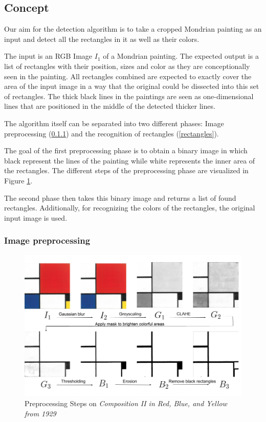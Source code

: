 \documentclass[serif,article,noparskip]{agse-thesis}
\begin{document}

\subsection{Concept} \label{concept}


Our aim for the detection algorithm is to take a cropped Mondrian painting as
an input and detect all the rectangles in it as well as their colors.

The input is an RGB Image $I_1$ of a Mondrian painting. The expected output is a
list of rectangles with their position, sizes and color as they are
conceptionally seen in the painting. All rectangles combined are expected to
exactly cover the area of the input image in a way that the original could be
dissected into this set of rectangles. The thick black lines in the paintings
are seen as one-dimensional lines that are positioned in the middle of the
detected thicker lines.

The algorithm itself can be separated into two different phases: Image
preprocessing (\ref{preprocessing}) and the recognition of rectangles (\ref{rectangles}).

The goal of the first preprocessing phase is to obtain a binary image in which
black represent the lines of the painting while white represents the inner area
of the rectangles. The different steps of the preprocessing phase are visualized
in Figure \ref{fig:preprocessing}.

The second phase then takes this binary image and returns a list of found
rectangles. Additionally, for recognizing the colors of the rectangles, the
original input image is used.

\subsubsection{Image preprocessing} \label{preprocessing}

\begin{figure}
  \includegraphics[width=\linewidth]{images/preprocessing_steps.png}
  \caption{Preprocessing Steps on \textit{Composition II in Red, Blue, and Yellow
  from 1929}}
  \label{fig:preprocessing}
\end{figure}
\end{document}
